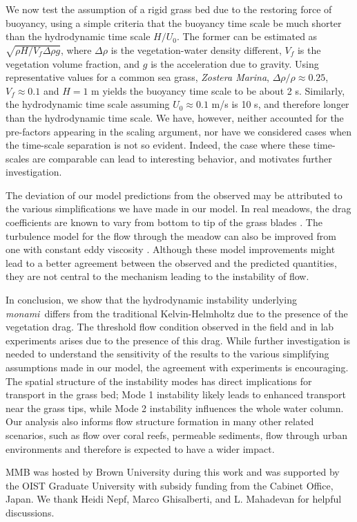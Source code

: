 \documentclass[aps,prl,twocolumn,superscriptaddress,sort&compress,10pt]{revtex4-1}  %
\newcommand{\monami}{\textit{monami}}
\begin{document}
We now test the assumption of a rigid grass bed due to the restoring force of buoyancy, using a simple criteria that the buoyancy time scale  be much shorter than the hydrodynamic time scale $H/U_0$.
The former can be estimated as $\sqrt{\rho H/V_f \Delta \rho g}$, where $\Delta \rho$ is the vegetation-water density different, $V_f$ is the vegetation volume fraction, and $g$ is the acceleration due to gravity. 
Using representative values for a common sea grass, \textit{Zostera Marina}, $\Delta \rho /\rho \approx 0.25$, $V_f \approx 0.1$ and $H=1$ m \cite{Fonseca98} yields the buoyancy time scale to be about 2 s. 
Similarly, the hydrodynamic time scale assuming $U_0 \approx 0.1$ m/s is 10 s, and therefore longer than the hydrodynamic time scale.
We have, however, neither accounted for the pre-factors appearing in the scaling argument, nor have we considered cases when the time-scale separation is not so evident.
Indeed, the case where these time-scales are comparable can lead to interesting behavior\cite{Delangre06}, and motivates further investigation. 

The deviation of our model predictions from the observed may be attributed to the various simplifications we have made in our model. 
In real meadows, the drag coefficients are known to vary from bottom to tip of the grass blades \cite{Vivoni98,Nepf00}. 
The turbulence model for the flow through the meadow can also be improved from one with constant eddy viscosity \cite{Ghisal02, Nepf04}. 
Although these model improvements might lead to a better agreement between the observed and the predicted quantities, they are not central to the mechanism leading to the instability of flow.

In conclusion, we show that the hydrodynamic instability underlying \monami ~differs from the traditional Kelvin-Helmholtz due to the presence of the vegetation drag. 
The threshold flow condition observed in the field and in lab experiments arises due to the presence of this drag. 
While further investigation is needed to understand the sensitivity of the results to the various simplifying assumptions made in our model, the agreement with experiments is encouraging.
The spatial structure of the instability modes has direct implications for transport in the grass bed; Mode 1 instability likely leads to enhanced transport near the grass tips, while Mode 2 instability influences the whole water column.
Our analysis also informs flow structure formation in many other related scenarios, such as flow over coral reefs, permeable sediments, flow through urban environments and therefore is expected to have a wider impact.

\acknowledgments
MMB was hosted by Brown University during this work and was supported by the OIST Graduate University with subsidy funding from the Cabinet Office, Japan. We thank Heidi Nepf, Marco Ghisalberti, and L. Mahadevan for helpful discussions.

{}
% 

\end{document}
